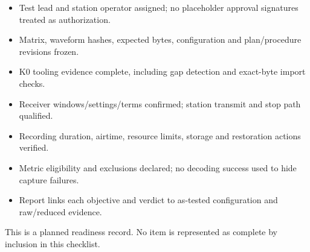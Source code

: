 \documentclass[11pt,a4paper]{article}
\begin{document}
\begin{itemize}
\item Test lead and station operator assigned; no placeholder approval signatures treated as authorization.
\item Matrix, waveform hashes, expected bytes, configuration and plan/procedure revisions frozen.
\item K0 tooling evidence complete, including gap detection and exact-byte import checks.
\item Receiver windows/settings/terms confirmed; station transmit and stop path qualified.
\item Recording duration, airtime, resource limits, storage and restoration actions verified.
\item Metric eligibility and exclusions declared; no decoding success used to hide capture failures.
\item Report links each objective and verdict to as-tested configuration and raw/reduced evidence.
\end{itemize}
This is a planned readiness record. No item is represented as complete by inclusion in this checklist.
\end{document}
